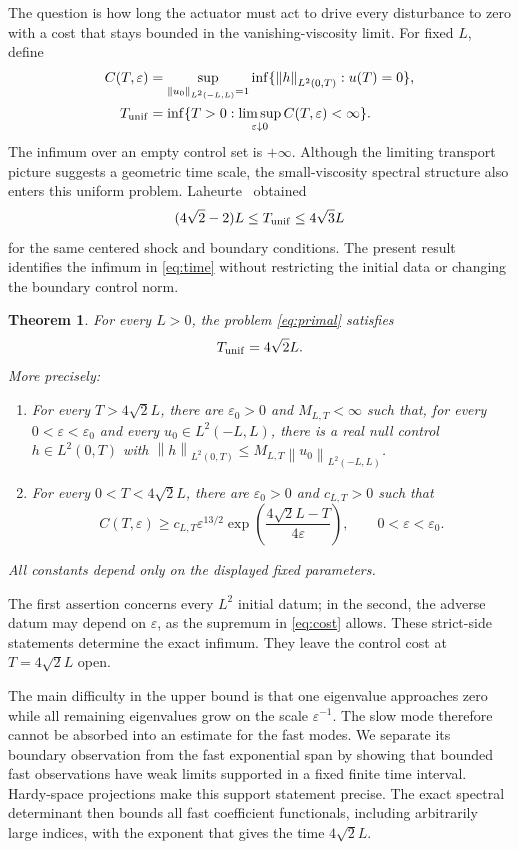 \documentclass[11pt]{article}
\numberwithin{equation}{section}
\newtheorem{theorem}{Theorem}[section]
\newcommand{\eps}{\varepsilon}
\newcommand{\norm}[1]{\left\|#1\right\|}
\begin{document}
The question is how long the actuator must act to drive every disturbance
to zero with a cost that stays bounded in the vanishing-viscosity limit.
For fixed $L$, define
\begin{align}
 C(T,\eps)
 &=\sup_{\norm{u_0}_{L^2(-L,L)}=1}
   \inf\{\norm h_{L^2(0,T)}:u(T)=0\},\label{eq:cost}\\
 T_{\rm unif}
 &=\inf\{T>0:\limsup_{\eps\downarrow0}C(T,\eps)<\infty\}.
 \label{eq:time}
\end{align}
The infimum over an empty control set is $+\infty$.
Although the limiting transport picture suggests a geometric time scale,
the small-viscosity spectral structure also enters this uniform problem.
Laheurte~\cite[Theorem 1.1 and Remark 1.2]{Laheurte} obtained
\begin{equation}\label{eq:old}
 (4\sqrt2-2)L\le T_{\rm unif}\le4\sqrt3L
\end{equation}
for the same centered shock and boundary conditions.
The present result identifies the infimum in \eqref{eq:time} without
restricting the initial data or changing the boundary control norm.

\begin{theorem}\label{thm:main}
For every $L>0$, the problem \eqref{eq:primal} satisfies
\[
 T_{\rm unif}=4\sqrt2L.
\]
More precisely:
\begin{enumerate}
 \item For every $T>4\sqrt2L$, there are $\eps_0>0$ and $M_{L,T}<\infty$
 such that, for every $0<\eps<\eps_0$ and every $u_0\in L^2(-L,L)$,
 there is a real null control $h\in L^2(0,T)$ with
 $\norm h_{L^2(0,T)}\le M_{L,T}\norm{u_0}_{L^2(-L,L)}$.
 \item For every $0<T<4\sqrt2L$, there are $\eps_0>0$ and $c_{L,T}>0$
 such that
 \begin{equation}\label{eq:lower-main}
  C(T,\eps)\ge c_{L,T}\eps^{13/2}
       \exp\!\left(\frac{4\sqrt2L-T}{4\eps}\right),
       \qquad 0<\eps<\eps_0.
 \end{equation}
\end{enumerate}
All constants depend only on the displayed fixed parameters.
\end{theorem}

The first assertion concerns every $L^2$ initial datum; in the second,
the adverse datum may depend on $\eps$, as the supremum in \eqref{eq:cost}
allows. These strict-side statements determine the exact infimum.
They leave the control cost at $T=4\sqrt2L$ open.

The main difficulty in the upper bound is that one eigenvalue approaches
zero while all remaining eigenvalues grow on the scale $\eps^{-1}$.
The slow mode therefore cannot be absorbed into an estimate for the fast
modes. We separate its boundary observation from the fast exponential
span by showing that bounded fast observations have weak limits supported
in a fixed finite time interval. Hardy-space projections make this
support statement precise. The exact spectral determinant then bounds
all fast coefficient functionals, including arbitrarily large indices,
with the exponent that gives the time $4\sqrt2L$.
\end{document}
